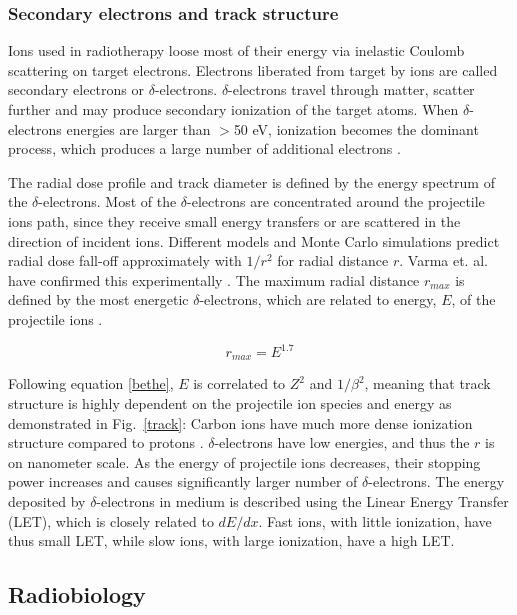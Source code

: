 \subsubsection{Secondary electrons and track structure}

Ions used in radiotherapy loose most of their energy via inelastic Coulomb scattering on target electrons. Electrons liberated from target by ions are called secondary electrons or $\delta$-electrons. 
$\delta$-electrons travel through matter, scatter further and may produce secondary ionization of the target atoms. When $\delta$-electrons energies are larger than $>$50 eV,
ionization becomes the dominant process, which produces a large number of additional electrons \cite{Kraft2000,Schardt2010}.

The radial dose profile and track diameter is defined by the energy spectrum of the $\delta$-electrons. Most of the $\delta$-electrons are concentrated around the projectile ions path, since they receive small energy transfers 
or are scattered in the direction of incident ions. Different models \cite{Chatterjee1976,Katz1999} and Monte Carlo simulations \cite{Paretzke1986,Kraemer1995} predict radial dose fall-off approximately with $1/r^2$ for radial distance $r$. Varma et. al. have confirmed 
this experimentally \cite{Varma1977}. The maximum radial distance $r_{max}$ is defined by the most energetic $\delta$-electrons, which are related to energy, $E$, of the projectile ions \cite{Kiefer1986}.

\begin{equation}
 r_{max} = E^{1.7}
\end{equation}

Following equation \ref{bethe}, $E$ is correlated to $Z^2$ and $1/\beta^2$, meaning that track structure is highly dependent on the projectile ion species and energy as demonstrated in Fig.~\ref{track}:
Carbon ions have much more dense ionization structure compared to protons \cite{Kraemer2010}. $\delta$-electrons have low energies, and thus the $r$ is on nanometer scale. As the energy of projectile ions decreases, their
stopping power increases and causes significantly larger number of $\delta$-electrons. The energy deposited by $\delta$-electrons in medium is described using the Linear Energy Transfer (LET), which is closely related to 
$dE/dx$. Fast ions, with little ionization, have thus small LET, while slow ions, with large ionization, have a high LET.


\subsection{Radiobiology}

